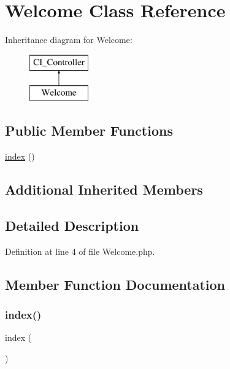 \hypertarget{class_welcome}{}\section{Welcome Class Reference}
\label{class_welcome}
Inheritance diagram for Welcome\+:\begin{figure}[H]
\begin{center}
\leavevmode
\includegraphics[height=2.000000cm]{class_welcome}
\end{center}
\end{figure}
\subsection*{Public Member Functions}
\begin{DoxyCompactItemize}
\item 
\mbox{\hyperlink{class_welcome_a149eb92716c1084a935e04a8d95f7347}{index}} ()
\end{DoxyCompactItemize}
\subsection*{Additional Inherited Members}


\subsection{Detailed Description}


Definition at line 4 of file Welcome.\+php.



\subsection{Member Function Documentation}
\mbox{\label{class_welcome_a149eb92716c1084a935e04a8d95f7347}} 
\subsubsection{\texorpdfstring{index()}{index()}}
{\footnotesize\ttfamily index (\begin{DoxyParamCaption}{ }\end{DoxyParamCaption})}

